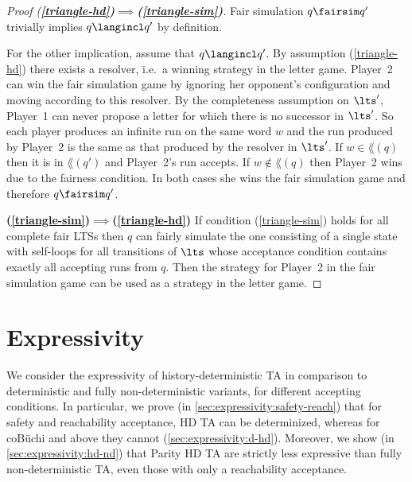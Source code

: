 \begin{proof}[Proof (\textbf{\ref{triangle-hd})$\implies$(\ref{triangle-sim})}]
Fair simulation $q \fairsim q'$ trivially implies $q \langincl q'$ by definition.

For the other implication, assume that $q \langincl q'$.
By assumption (\ref{triangle-hd}) there exists a resolver, i.e.~a winning strategy in the letter game.
    Player~2 can win the fair simulation game by ignoring her opponent's configuration and moving according to this resolver. By the completeness assumption on $\lts'$,
    Player~1 can never propose a letter for which there is no successor in $\lts'$. So each player produces an infinite run on the same word $w$ and the run produced by Player~2 is the same as that produced by the resolver in $\lts'$. 
    If $w\in\lang(q)$ then it is in $\lang(q')$ and Player~2's run accepts.
    If $w\notin\lang(q)$ then Player~2 wins due to the fairness condition.
    In both cases she wins the fair simulation game and therefore $q \fairsim q'$.


    \textbf{(\ref{triangle-sim})$\implies$(\ref{triangle-hd})}
    If condition (\ref{triangle-sim}) holds for all complete fair LTSs then $q$ can fairly simulate the one
    consisting of a single state with self-loops for all transitions of $\lts$ whose acceptance condition contains exactly all accepting runs from $q$. Then the strategy for Player~2 in the fair simulation game
    can be used as a strategy in the letter game.
\end{proof}
	
	
	\section{Expressivity}
	\label{sec:expressivity}
We consider the expressivity of history-deterministic TA in comparison to deterministic and fully non-deterministic variants, for different accepting conditions.
In particular, we prove (in \cref{sec:expressivity:safety-reach}) 
that for safety and reachability acceptance, HD TA can be determinized,
whereas for coB\"uchi and above they cannot (\cref{sec:expressivity:d-hd}).
Moreover, we show (in \cref{sec:expressivity:hd-nd}) that Parity HD TA are strictly less expressive than fully non-deterministic TA, even those with only a reachability acceptance.

